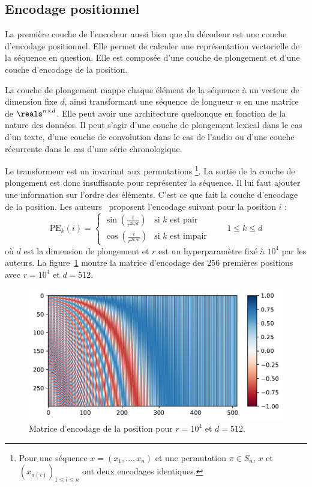 \subsection{Encodage positionnel}

La première couche de l'encodeur aussi bien que du décodeur est une couche d'encodage positionnel.
Elle permet de calculer une représentation vectorielle de la séquence en question.
Elle est composée d'une couche de plongement et d'une couche d'encodage de la position.

La couche de plongement mappe chaque élément de la séquence à un vecteur de dimension fixe \(d\),
ainsi transformant une séquence de longueur \(n\) en une matrice de \(\reals^{n \times d}\).
Elle peut avoir une architecture quelconque en fonction de la nature des données.
Il peut s'agir d'une couche de plongement lexical dans le cas d'un texte, 
d'une couche de convolution dans le cas de l'audio 
ou d'une couche récurrente dans le cas d'une série chronologique.

Le transformeur est un invariant aux permutations%
\footnote{%
    Pour une séquence \(x = (x_1, \ldots, x_n)\) et une permutation \(\pi\in S_n\),
    \(x\) et \(\left(x_{\pi(i)}\right)_{1 \le i \le n}\) ont deux encodages identiques.
}.
La sortie de la couche de plongement est donc insuffisante pour représenter la séquence.
Il lui faut ajouter une information sur l'ordre des éléments.
C'est ce que fait la couche d'encodage de la position.
Les auteurs~\cite{attention} proposent l'encodage suivant pour la position \(i\) :
\begin{equation}
    \label{eq.sine-positional-encoding}
    \mathrm{PE}_{k}(i) = 
    \begin{cases}
        \sin\left(\frac{i}{r^{2k/d}}\right) & \text{si } k \text{ est pair} \\
        \cos\left(\frac{i}{r^{2k/d}}\right) & \text{si } k \text{ est impair}
    \end{cases} \qquad 1 \le k \le d
\end{equation}
où \(d\) est la dimension de plongement et \(r\) est un hyperparamètre fixé à \(10^4\) par les auteurs.
La figure~\ref{fig.positional-encoding} montre la matrice d'encodage des \(256\) premières positions
avec \(r=10^4\) et \(d=512\).

\begin{figure}[htb]
    \centering
    \includegraphics[width=12cm]{assets/python/positional_embedding.pdf}
    \caption{Matrice d'encodage de la position pour \(r=10^4\) et \(d=512\).}
    \label{fig.positional-encoding}
\end{figure}

